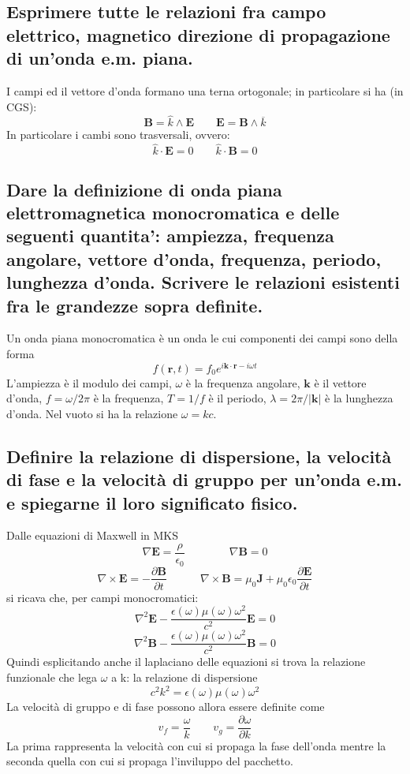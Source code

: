 \subsection[]{ Esprimere tutte le relazioni fra campo elettrico, magnetico direzione di propagazione di un’onda e.m. piana.}
I campi ed il vettore d'onda formano una terna ortogonale; in particolare si ha (in CGS):
\[
	\boldsymbol{B} = \hat{k} \wedge \boldsymbol{E} \quad \quad 
	\boldsymbol{E} = \boldsymbol{B} \wedge \overline{k} 
\] 
In particolare i cambi sono trasversali, ovvero:
\[
	\hat{k} \cdot \boldsymbol{E} = 0 \quad \quad 
	\hat{k} \cdot \boldsymbol{B} = 0
\] 

\subsection[]{ Dare la definizione di onda piana elettromagnetica monocromatica e delle seguenti quantita’: ampiezza, frequenza angolare, vettore d’onda, frequenza, periodo, lunghezza
d’onda. Scrivere le relazioni esistenti fra le grandezze sopra definite.}
Un onda piana monocromatica è un onda le cui componenti dei campi sono della forma 
\[
	f\left( \boldsymbol{r}, t \right) = f_{0} e^{i \boldsymbol{k} \cdot \boldsymbol{r} - i \omega t }
\] 
L'ampiezza è il modulo dei campi, $\omega$ è la frequenza angolare, $\boldsymbol{k}$ è il vettore d'onda, $f = \omega/2\pi$ è la frequenza, $T = 1/f$ è il periodo, $\lambda = 2\pi/\boldsymbol{|k|}$ è la lunghezza d'onda. Nel vuoto si ha la relazione $\omega = k c$.

\subsection[]{ Definire la relazione di dispersione, la velocità di fase e la velocità di gruppo per un’onda e.m. e spiegarne il loro significato fisico. }
Dalle equazioni di Maxwell in MKS
\[
	\nabla \boldsymbol{E} = \frac{\rho}{\epsilon_0} \quad \quad \quad \quad 
	\nabla \boldsymbol{B} = 0 
\] 
\[
	\nabla \times \boldsymbol{E} = - \frac{\partial \boldsymbol{B} }{\partial t} \quad \quad \quad
	\nabla \times \boldsymbol{B} = \mu_0 \boldsymbol{J} + \mu_0 \epsilon_0 \frac{\partial \boldsymbol{E} }{\partial t} 
\] 
si ricava che, per campi monocromatici:	
\[
	\nabla^{2}\boldsymbol{E} - \frac{\epsilon\left( \omega \right) \mu \left( \omega \right) \omega^{2}}{c^{2}}\boldsymbol{E} = 0 
\]
\[
	\nabla^{2}\boldsymbol{B} - \frac{\epsilon\left( \omega \right) \mu \left( \omega \right) \omega^{2}}{c^{2}}\boldsymbol{B} = 0
\] 
Quindi esplicitando anche il laplaciano delle equazioni si trova la relazione funzionale che lega $\omega$ a k: la relazione di dispersione
\[
	c^{2}k^{2} = \epsilon \left( \omega \right) \mu \left( \omega \right) \omega^{2}
\] 
La velocità di gruppo e di fase possono allora essere definite come
\[
v_{f} = \frac{\omega}{k} \quad \quad 
v_{g} = \frac{\partial \omega}{\partial k} 
\]
La prima rappresenta la velocità con cui si propaga la fase dell'onda mentre la seconda quella con cui si propaga l'inviluppo del pacchetto. 
